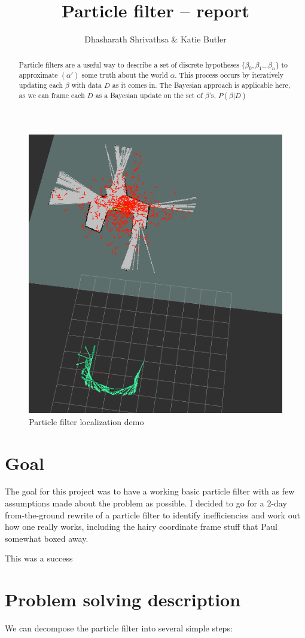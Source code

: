 \documentclass[]{article}
\title{Particle filter -- report}
\author{Dhasharath Shrivathsa \& Katie Butler}
\begin{document}
\maketitle

\begin{abstract}
Particle filters are a useful way to describe a set of discrete hypotheses $\{\beta_0, \beta_1 ...\beta_n\}$ to approximate $(\alpha')$ some truth about the world $\alpha$. This process occurs by iteratively updating each $\beta$ with data $D$ as it comes in. The Bayesian approach is applicable here, as we can frame each $D$ as a Bayesian update on the set of $\beta$'s, $P(\beta|D)$
\end{abstract}
\begin{figure}[H]
	\centering
	\includegraphics[width=0.7\linewidth]{pf_convergence}
	\caption{Particle filter localization demo}
	\label{fig:pfconvergence}
\end{figure}

\section{Goal}
The goal for this project was to have a working basic particle filter with as few assumptions made about the problem as possible. I decided to go for a 2-day from-the-ground rewrite of a particle filter to identify inefficiencies and work out how one really works, including the hairy coordinate frame stuff that Paul somewhat boxed away.

This was a success
\section{Problem solving description}
We can decompose the particle filter into several simple steps:
\end{document}

